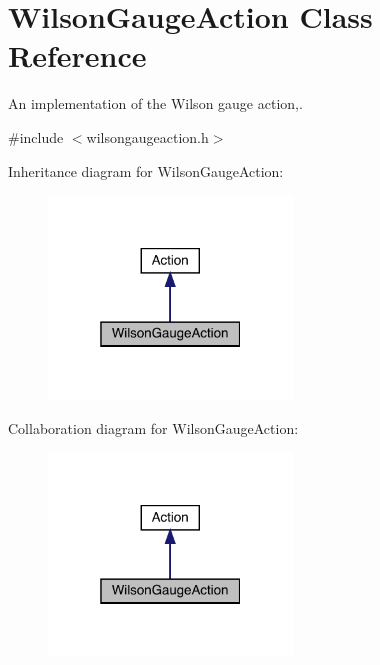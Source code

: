 \hypertarget{class_wilson_gauge_action}{}\section{Wilson\+Gauge\+Action Class Reference}
\label{class_wilson_gauge_action}


An implementation of the Wilson gauge action,.  




{\ttfamily \#include $<$wilsongaugeaction.\+h$>$}



Inheritance diagram for Wilson\+Gauge\+Action\+:\nopagebreak
\begin{figure}[H]
\begin{center}
\leavevmode
\includegraphics[width=184pt]{class_wilson_gauge_action__inherit__graph}
\end{center}
\end{figure}


Collaboration diagram for Wilson\+Gauge\+Action\+:\nopagebreak
\begin{figure}[H]
\begin{center}
\leavevmode
\includegraphics[width=184pt]{class_wilson_gauge_action__coll__graph}
\end{center}
\end{figure}

